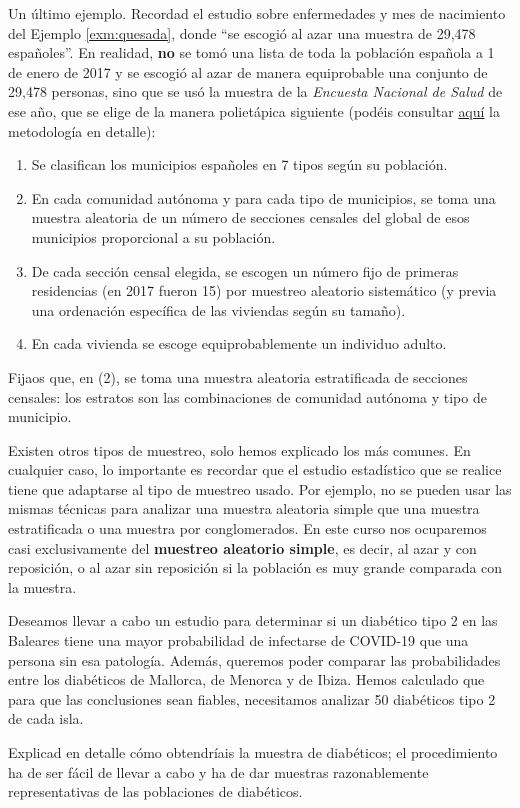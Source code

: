 \documentclass[
]{book}
\theoremstyle{definition}
\theoremstyle{definition}
\theoremstyle{definition}
\theoremstyle{definition}
\theoremstyle{remark}
\begin{document}
Un último ejemplo. Recordad el estudio sobre enfermedades y mes de nacimiento del Ejemplo \ref{exm:quesada}, donde ``se escogió al azar una muestra de 29,478 españoles''. En realidad, \textbf{no} se tomó una lista de toda la población española a 1 de enero de 2017 y se escogió al azar de manera equiprobable una conjunto de 29,478 personas, sino que se usó la muestra de la \emph{Encuesta Nacional de Salud} de ese año, que se elige de la manera polietápica siguiente (podéis consultar \href{https://www.ine.es/metodologia/t15/t153041917.pdf}{aquí} la metodología en detalle):

\begin{enumerate}
\def\labelenumi{\arabic{enumi}.}
\item
  Se clasifican los municipios españoles en 7 tipos según su población.
\item
  En cada comunidad autónoma y para cada tipo de municipios, se toma una muestra aleatoria de un número de secciones censales del global de esos municipios proporcional a su población.
\item
  De cada sección censal elegida, se escogen un número fijo de primeras residencias (en 2017 fueron 15) por muestreo aleatorio sistemático (y previa una ordenación específica de las viviendas según su tamaño).
\item
  En cada vivienda se escoge equiprobablemente un individuo adulto.
\end{enumerate}

Fijaos que, en (2), se toma una muestra aleatoria estratificada de secciones censales: los estratos son las combinaciones de comunidad autónoma y tipo de municipio.

Existen otros tipos de muestreo, solo hemos explicado los más comunes. En cualquier caso, lo importante es recordar que el estudio estadístico que se realice tiene que adaptarse al tipo de muestreo usado. Por ejemplo, no se pueden usar las mismas técnicas para analizar una muestra aleatoria simple que una muestra estratificada o una muestra por conglomerados. En este curso nos ocuparemos casi exclusivamente del \textbf{muestreo aleatorio simple}, es decir, al azar y con reposición, o al azar sin reposición si la población es muy grande comparada con la muestra.

\begin{rmdexercici}
Deseamos llevar a cabo un estudio para determinar si un diabético tipo 2 en las Baleares tiene una mayor probabilidad de infectarse de COVID-19 que una persona sin esa patología. Además, queremos poder comparar las probabilidades entre los diabéticos de Mallorca, de Menorca y de Ibiza. Hemos calculado que para que las conclusiones sean fiables, necesitamos analizar 50 diabéticos tipo 2 de cada isla.

Explicad en detalle cómo obtendríais la muestra de diabéticos; el procedimiento ha de ser fácil de llevar a cabo y ha de dar muestras razonablemente representativas de las poblaciones de diabéticos.
\end{rmdexercici}
\end{document}
